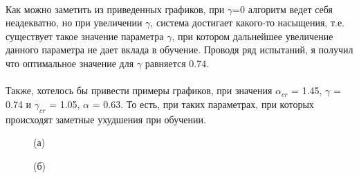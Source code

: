 \documentclass[a4paper]{report}
\theoremstyle{definition}
\theoremstyle{plain}
\theoremstyle{remark}
\theoremstyle{remark}
\theoremstyle{definition}
\begin{document}
\\
Как можно заметить из приведенных графиков, при $\gamma$=0 алгоритм ведет себя неадекватно, но при увеличении $\gamma$, система достигает какого-то насыщения, т.е. существует такое значение параметра $\gamma$, при котором дальнейшее увеличение данного параметра не дает вклада в обучение. Проводя ряд испытаний, я получил что оптимальное значение для $\gamma$ равняется 0.74.
\\
\\
Также, хотелось бы привести примеры графиков, при значения $\alpha_{cr}$ = 1.45, $\gamma$ = 0.74 и $\gamma_{cr}$ = 1.05, $\alpha$ = 0.63. То есть, при таких параметрах, при которых происходят заметные ухудшения при обучении.
\begin{figure}[H]
    \begin{minipage}[H]{0.49\linewidth}
        (а)\\
    \end{minipage}
    \hfill
    \begin{minipage}[H]{0.49\linewidth}
        (б)\\

\end{minipage}
\end{figure}
\end{document}

